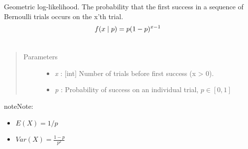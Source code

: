 \documentclass[letterpaper,10pt,english]{sphinxmanual}
\begin{document}

\begin{fulllineitems}
\label{distributions:pymc.distributions.geometric_like}
Geometric log-likelihood. The probability that the first success in a
sequence of Bernoulli trials occurs on the x'th trial.
\begin{gather}
\begin{split}f(x \mid p) = p(1-p)^{x-1}\end{split}\notag\\\begin{split}\end{split}\notag
\end{gather}\begin{quote}\begin{description}
\item[{Parameters }] \leavevmode\begin{itemize}
\item {} 
\emph{x} : {[}int{]} Number of trials before first success (x \textgreater{} 0).

\item {} 
\emph{p} : Probability of success on an individual trial, $p \in [0,1]$

\end{itemize}

\end{description}\end{quote}

\begin{notice}{note}{Note:}\begin{itemize}
\item {} 
$E(X)=1/p$

\item {} 
$Var(X)=\frac{1-p}{p^2}$

\end{itemize}
\end{notice}

\end{fulllineitems}

\end{document}
